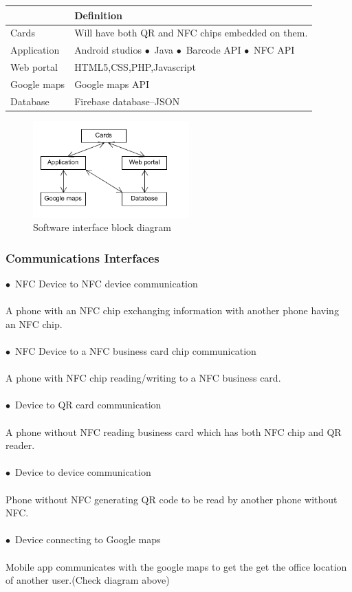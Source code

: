 \documentclass[english]{article}
\begin{document}
\begin{tabular}{ |p{3cm}|p{9cm}|  }
				\hline
				\textbf{} & \textbf{Definition}\\
				\hline
				Cards & Will have both QR and NFC chips embedded on them.\\
				\hline
				Application & Android studios
$\bullet$\ Java
$\bullet$\ Barcode API
$\bullet$\ NFC API
\\
				\hline
				 Web portal & HTML5,CSS,PHP,Javascript\\
				
				\hline
				 Google maps & Google maps API\\
				\hline
				 Database & Firebase database–JSON\\
				\hline
				
				\end{tabular}
\begin{figure}[ht!]
\centering
\includegraphics[width=60mm]{Software.png}
\caption{Software interface block diagram}
\end{figure}
	
					
\subsubsection{Communications Interfaces}




$\bullet$\ NFC Device to NFC device communication\\ \\
 A phone with an NFC chip exchanging information with another phone having an NFC chip.\\  \\
$\bullet$\ NFC Device to a NFC business card chip communication\\ \\
 A phone with NFC chip reading/writing to a NFC business card.\\  \\
$\bullet$\ Device to QR card communication\\ \\
A phone without NFC reading business card which has both NFC chip and QR reader.\\ \\
$\bullet$\ Device to device communication\\ \\
 Phone without NFC generating QR code to be read by another phone without NFC.\\ \\
$\bullet$\ Device connecting to Google maps\\ \\
Mobile app communicates with the google maps to get the get the office location of another user.(Check diagram above)
\end{document}
